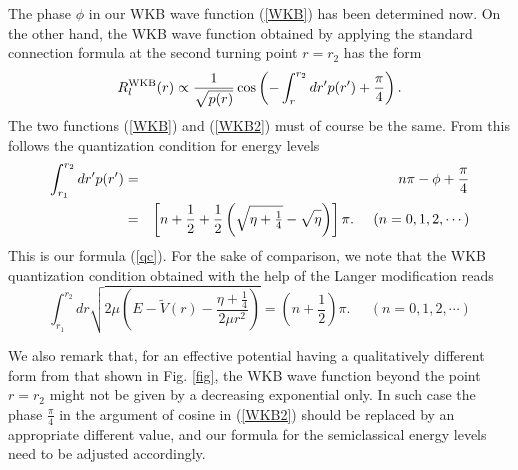 \documentclass[a4paper,aps,eqsecnum,preprint,preprintnumbers,12pt]{revtex4}
\begin{document}
The phase $\phi$ in our WKB wave function (\ref{WKB}) has been
determined now. On the other hand, the WKB wave function obtained
by applying the standard connection formula at the second turning
point $r=r_{2}$ has the form
\begin{equation} \label{WKB2}
R_{l}^{\rm WKB}(r) \propto \frac{1}{\sqrt{p(r)}} \cos \left( -
\int_{r}^{r_{2}} dr' p(r') + \frac{\pi}{4} \right).
\end{equation}
The two functions (\ref{WKB}) and (\ref{WKB2}) must of course be
the same. From this follows the quantization condition for energy
levels
\begin{eqnarray} \label{WKBcon}
\int_{r_{1}}^{r_{2}} dr' p(r') &=& n\pi - \phi + \frac{\pi}{4}
\nonumber \\
&=& \left[ n + \frac{1}{2} + \frac{1}{2} \left( \sqrt{ \mathstrut
\eta + \textstyle \frac{1}{4} } - \sqrt{ \mathstrut \eta } \right)
\right] \pi. \;\;\;\;\; ( n = 0, 1, 2, \cdots )
\end{eqnarray}
This is our formula (\ref{qc}). For the sake of comparison, we
note that the WKB quantization condition obtained with the help of
the Langer modification reads
\begin{equation} \label{langercon}
\int_{r_{1}}^{r_{2}} dr \sqrt{ 2\mu \left( E - \tilde{V}(r) -
\frac{\eta+\frac{1}{4}}{2\mu r^{2}} \right) } = \left( n +
\frac{1}{2} \right) \pi. \;\;\;\;\; ( n = 0, 1, 2, \cdots )
\end{equation}

We also remark that, for an effective potential having a
qualitatively different form from that shown in Fig. \ref{fig},
the WKB wave function beyond the point $r=r_{2}$ might not be
given by a decreasing exponential only. In such case the phase
$\displaystyle \frac{\pi}{4}$ in the argument of cosine in
(\ref{WKB2}) should be replaced by an appropriate different value,
and our formula for the semiclassical energy levels need to be
adjusted accordingly.
\end{document}
